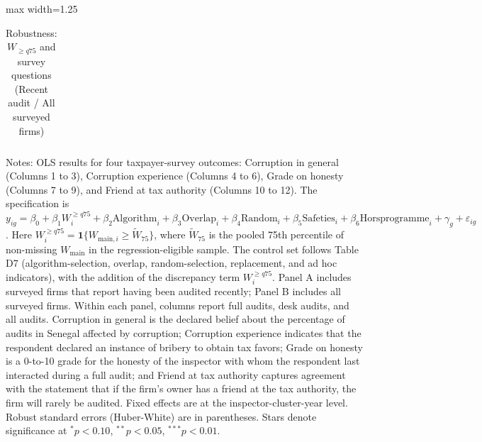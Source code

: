 \documentclass{article}
\newcommand{\OutPath}{Output/}%
\newcommand{\OutPath}{../Output/}%
\begin{document}
\begin{landscape}
\begin{table}[!htbp]
\centering
\begin{adjustbox}{max width=1.25\textwidth}
\begin{threeparttable}
\caption{Robustness: \(W_{\ge q75}\) and survey questions (Recent audit / All surveyed firms)}
\begin{tabular}{l*{12}{c}}

\end{tabular}
\begin{tablenotes}[flushleft]
\footnotesize
\item Notes: OLS results for four taxpayer-survey outcomes: Corruption in general (Columns 1 to 3), Corruption experience (Columns 4 to 6), Grade on honesty (Columns 7 to 9), and Friend at tax authority (Columns 10 to 12). The specification is \(y_{ig}=\beta_0+\beta_1 W_i^{\ge q75}+\beta_2 \text{Algorithm}_i+\beta_3 \text{Overlap}_i+\beta_4 \text{Random}_i+\beta_5 \text{Safeties}_i+\beta_6 \text{Horsprogramme}_i+\gamma_g+\varepsilon_{ig}\). Here \(W_i^{\ge q75}=\mathbf{1}\{W_{\text{main},i}\ge\widetilde{W}_{75}\}\), where \(\widetilde{W}_{75}\) is the pooled 75th percentile of non-missing \(W_{\text{main}}\) in the regression-eligible sample. The control set follows Table D7 (algorithm-selection, overlap, random-selection, replacement, and ad hoc indicators), with the addition of the discrepancy term \(W_i^{\ge q75}\). Panel A includes surveyed firms that report having been audited recently; Panel B includes all surveyed firms. Within each panel, columns report full audits, desk audits, and all audits. Corruption in general is the declared belief about the percentage of audits in Senegal affected by corruption; Corruption experience indicates that the respondent declared an instance of bribery to obtain tax favors; Grade on honesty is a 0-to-10 grade for the honesty of the inspector with whom the respondent last interacted during a full audit; and Friend at tax authority captures agreement with the statement that if the firm's owner has a friend at the tax authority, the firm will rarely be audited. Fixed effects are at the inspector-cluster-year level. Robust standard errors (Huber-White) are in parentheses. Stars denote significance at \(^{*}p<0.10\), \(^{**}p<0.05\), \(^{***}p<0.01\).
\end{tablenotes}
\end{threeparttable}
\end{adjustbox}
\end{table}
\end{landscape}
\end{document}
